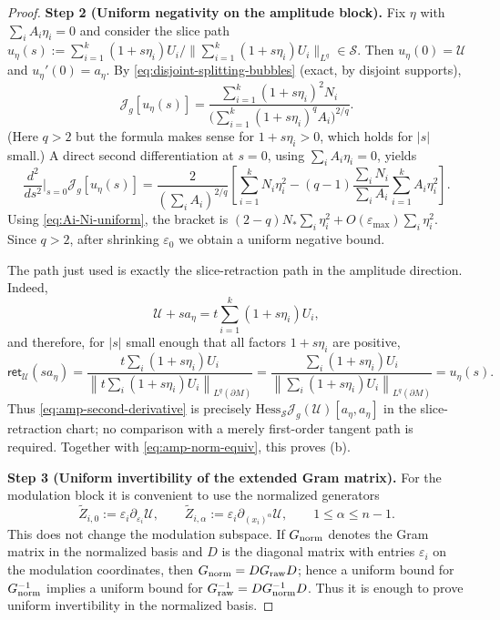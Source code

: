 \documentclass[11pt,reqno,a4paper]{amsart}
\numberwithin{equation}{section}
\theoremstyle{plain}
\theoremstyle{remark}
\theoremstyle{plain}
\begin{document}
\begin{proof}
\medskip\noindent
\textbf{Step 2 (Uniform negativity on the amplitude block).}
Fix $\eta$ with $\sum_iA_i\eta_i=0$ and consider the slice path
$u_\eta(s):=\sum_{i=1}^k(1+s\eta_i)U_i/\|\sum_{i=1}^k(1+s\eta_i)U_i\|_{L^q}\in\mathcal S$.
Then $u_\eta(0)=\mathcal U$ and $u_\eta'(0)=a_\eta$.
By \eqref{eq:disjoint-splitting-bubbles} (exact, by disjoint supports),
\[
\mathcal J_g[u_\eta(s)]
=\frac{\sum_{i=1}^k (1+s\eta_i)^2N_i}
{\Big(\sum_{i=1}^k (1+s\eta_i)^qA_i\Big)^{2/q}}.
\]
(Here $q>2$ but the formula makes sense for $1+s\eta_i>0$, which holds for $|s|$ small.)
A direct second differentiation at $s=0$, using $\sum_iA_i\eta_i=0$, yields
\begin{equation}\label{eq:amp-second-derivative}
\frac{d^2}{ds^2}\Big|_{s=0}\mathcal J_g[u_\eta(s)]
=\frac{2}{(\sum_iA_i)^{2/q}}
\left[\sum_{i=1}^k N_i\eta_i^2-(q-1)\frac{\sum_iN_i}{\sum_iA_i}\sum_{i=1}^k A_i\eta_i^2\right].
\end{equation}
Using \eqref{eq:Ai-Ni-uniform}, the bracket is $(2-q)N_\ast\sum_i\eta_i^2+O(\varepsilon_{\max})\sum_i\eta_i^2$.
Since $q>2$, after shrinking $\varepsilon_0$ we obtain a uniform negative bound.

The path just used is exactly the slice-retraction path in the amplitude direction.  Indeed,
\[
\mathcal U+s a_\eta
=t\sum_{i=1}^k(1+s\eta_i)U_i,
\]
and therefore, for $|s|$ small enough that all factors $1+s\eta_i$ are positive,
\[
\mathsf{ret}_{\mathcal U}(s a_\eta)
=\frac{t\sum_i(1+s\eta_i)U_i}
{\left\|t\sum_i(1+s\eta_i)U_i\right\|_{L^q(\partial M)}}
=\frac{\sum_i(1+s\eta_i)U_i}
{\left\|\sum_i(1+s\eta_i)U_i\right\|_{L^q(\partial M)}}
=u_\eta(s).
\]
Thus \eqref{eq:amp-second-derivative} is precisely
$\mathrm{Hess}_{\mathcal S}\mathcal J_g(\mathcal U)[a_\eta,a_\eta]$ in the slice-retraction chart; no
comparison with a merely first-order tangent path is required.  Together with
\eqref{eq:amp-norm-equiv}, this proves \textup{(b)}.

\medskip\noindent
\textbf{Step 3 (Uniform invertibility of the extended Gram matrix).}
For the modulation block it is convenient to use the normalized generators
\[
\widetilde Z_{i,0}:=\varepsilon_i\partial_{\varepsilon_i}\mathcal U,
\qquad
\widetilde Z_{i,\alpha}:=\varepsilon_i\partial_{(x_i)^\alpha}\mathcal U,
\qquad 1\le\alpha\le n-1.
\]
This does not change the modulation subspace.  If $G_{\rm norm}$ denotes the Gram matrix in the
normalized basis and $D$ is the diagonal matrix with entries $\varepsilon_i$ on the modulation
coordinates, then $G_{\rm norm}=DG_{\rm raw}D$; hence a uniform bound for
$G_{\rm norm}^{-1}$ implies a uniform bound for $G_{\rm raw}^{-1}=DG_{\rm norm}^{-1}D$.
Thus it is enough to prove uniform invertibility in the normalized basis.


\end{proof}
\end{document}
